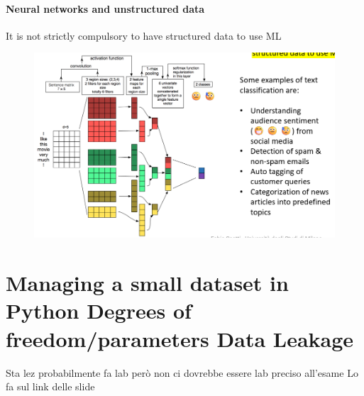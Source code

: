 \documentclass{report}
\begin{document}
\subsubsection{Neural networks and unstructured data}
\noindent It is not strictly compulsory to have structured data to use ML 

\begin{figure}[H]
    \centering
    \includegraphics[width=0.8\linewidth]{images/unstructured data.png}
\end{figure}



\chapter{Managing a small dataset in Python Degrees of freedom/parameters Data Leakage}
Sta lez probabilmente fa lab però non ci dovrebbe essere lab preciso all'esame 
Lo fa sul link delle slide
\end{document}
